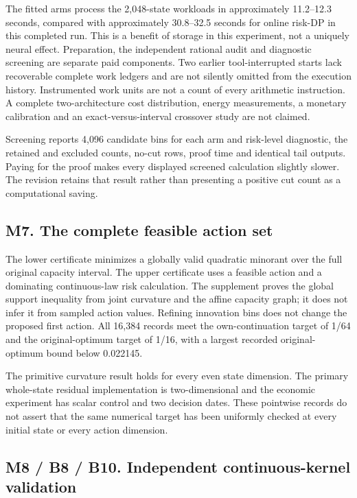 The fitted arms process the 2,048-state workloads in approximately
11.2--12.3 seconds, compared with approximately 30.8--32.5 seconds for
online risk-DP in this completed run. This is a benefit of storage in
this experiment, not a uniquely neural effect. Preparation, the
independent rational audit and diagnostic screening are separate paid
components. Two earlier tool-interrupted starts lack recoverable
complete work ledgers and are not silently omitted from the execution
history. Instrumented work units are not a count of every arithmetic
instruction. A complete two-architecture cost distribution, energy
measurements, a monetary calibration and an exact-versus-interval
crossover study are not claimed.

Screening reports 4,096 candidate bins for each arm and risk-level
diagnostic, the retained and excluded counts, no-cut rows, proof time
and identical tail outputs. Paying for the proof makes every displayed
screened calculation slightly slower. The revision retains that result
rather than presenting a positive cut count as a computational saving.

\hypertarget{m7.-the-complete-feasible-action-set}{%
\subsection{M7. The complete feasible action
set}\label{m7.-the-complete-feasible-action-set}}

The lower certificate minimizes a globally valid quadratic minorant over
the full original capacity interval. The upper certificate uses a
feasible action and a dominating continuous-law risk calculation. The
supplement proves the global support inequality from joint curvature and
the affine capacity graph; it does not infer it from sampled action
values. Refining innovation bins does not change the proposed first
action. All 16,384 records meet the own-continuation target of 1/64 and
the original-optimum target of 1/16, with a largest recorded
original-optimum bound below 0.022145.

The primitive curvature result holds for every even state dimension. The
primary whole-state residual implementation is two-dimensional and the
economic experiment has scalar control and two decision dates. These
pointwise records do not assert that the same numerical target has been
uniformly checked at every initial state or every action dimension.

\hypertarget{m8-b8-b10.-independent-continuous-kernel-validation}{%
\subsection{M8 / B8 / B10. Independent continuous-kernel
validation}\label{m8-b8-b10.-independent-continuous-kernel-validation}}

